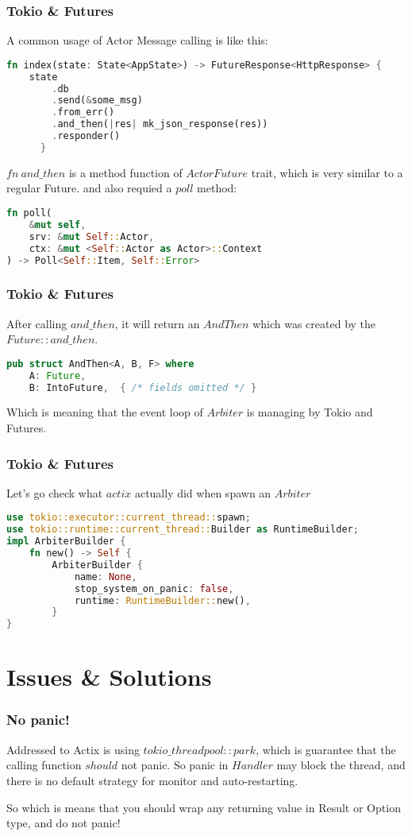 \documentclass[notheorems, aspectratio=54]{beamer}
\begin{document}
\begin{frame}[fragile]
  \frametitle{Tokio \& Futures}
  A common usage of Actor Message calling is like this:
  \begin{lstlisting}[language=Rust]
  fn index(state: State<AppState>) -> FutureResponse<HttpResponse> {
    state
        .db
        .send(&some_msg)
        .from_err()
        .and_then(|res| mk_json_response(res))
        .responder()
      }
    \end{lstlisting}

    $fn\ and\_then$ is a method function of $ActorFuture$ trait, which is very similar to a regular Future.
    and also requied a $poll$ method:
    \begin{lstlisting}[language=Rust]
fn poll(
    &mut self,
    srv: &mut Self::Actor,
    ctx: &mut <Self::Actor as Actor>::Context
) -> Poll<Self::Item, Self::Error>
\end{lstlisting}
\end{frame}

\begin{frame}[fragile]
  \frametitle{Tokio \& Futures}
  After calling $and\_then$, it will return an $AndThen$ which was created by the $Future::and\_then$.
  \begin{lstlisting}[language=Rust]
  pub struct AndThen<A, B, F> where
    A: Future,
    B: IntoFuture,  { /* fields omitted */ }
  \end{lstlisting}
  Which is meaning that the event loop of $Arbiter$ is managing by Tokio and Futures.
\end{frame}

\begin{frame}[fragile]
  \frametitle{Tokio \& Futures}
  Let's go check what $actix$ actually did when spawn an $Arbiter$
  \begin{lstlisting}[language=Rust]
use tokio::executor::current_thread::spawn;
use tokio::runtime::current_thread::Builder as RuntimeBuilder;
impl ArbiterBuilder {
    fn new() -> Self {
        ArbiterBuilder {
            name: None,
            stop_system_on_panic: false,
            runtime: RuntimeBuilder::new(),
        }
}
  \end{lstlisting}
\end{frame}


\section{Issues \& Solutions}
\begin{frame}[fragile]
  \frametitle{No panic!}

  Addressed to Actix is using $tokio\_threadpool::park$, which is guarantee that the calling function $should$ not panic. So panic in $Handler$ may block the thread, and there is no default strategy for monitor and auto-restarting.

  So which is means that you should wrap any returning value in Result or Option type, and do not panic!
\end{frame}
\end{document}
